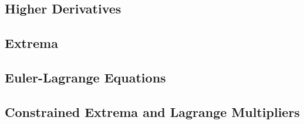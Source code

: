 \documentclass[letterpaper,twoside,12pt]{article}
\theoremstyle{mystyle}
\begin{document}
\subsection{Higher Derivatives}





\subsection{Extrema}





\subsection{Euler-Lagrange Equations}





\subsection{Constrained Extrema and Lagrange Multipliers}
\end{document}
